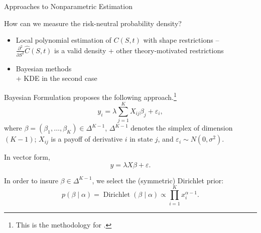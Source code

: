 \documentclass[10pt,aspectratio=43]{beamer}
\begin{document}
\begin{frame}{Approaches to Nonparametric Estimation}

    How can we measure the risk-neutral probability density?

    \begin{itemize}  \setlength\itemsep{1em}
        \item Local polynomial estimation of $C(S,t)$ with shape restrictions --\\ $\frac{\partial^2}{\partial S^2}\hat C(S,t)$ is a valid density + other theory-motivated restrictions \\ {\scriptsize\parencite{ait-sahaliaNonparametricOptionPricing2003,leeEstimationRiskneutralMeasures2014}}
        \item Bayesian methods \\{\scriptsize\parencite{fisherSimplexRegression2016, hardleStatePriceDensities2015,tabogaOptionimpliedProbabilityDistributions2016} + KDE in the second case}
    \end{itemize}
\end{frame}

\begin{frame}{Bayesian Formulation}
    \cite{fisherSimplexRegression2016} proposes the following approach.\footnote[frame]{\tiny This is the methodology for \cite{MarketProbabilityTracker}.}
\vspace{-2ex}
    \[y_i=\lambda\sum_{j=1}^KX_{ij}\beta_j+\varepsilon_i,\]
    where $\beta=(\beta_1,\dots, \beta_K)\in \Delta^{K-1}$, $\Delta^{K-1}$ denotes the simplex of dimension $(K-1)$; $X_{ij}$ is a payoff of derivative $i$ in state $j$, and $\varepsilon_i\sim N(0,\sigma^2)$.

    In vector form,
    \[y=\lambda X \beta+\varepsilon.\]

\vspace{-2ex}
    In order to insure $\beta\in \Delta^{K-1}$, we select the (symmetric) Dirichlet prior:
    \[p(\beta\mid \alpha)=\operatorname{Dirichlet}(\beta\mid \alpha)\propto \prod_{i=1}^{K}x_{i}^{\alpha-1}.\]

\end{frame}
\end{document}
